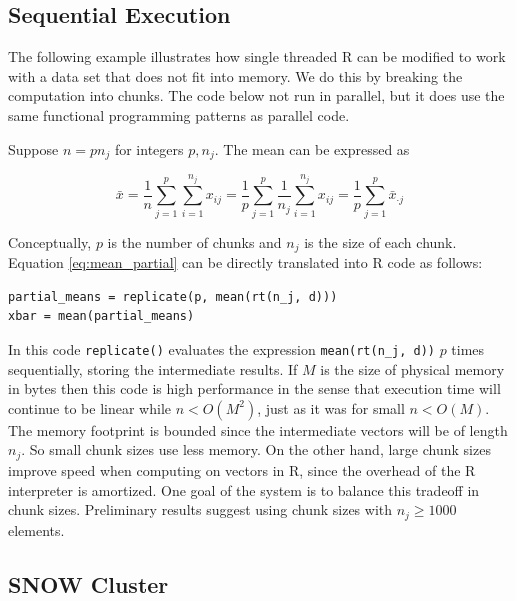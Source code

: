 \documentclass[12pt]{article}
\begin{document}
\subsection{Sequential Execution}
\label{sec:sequential}

The following example illustrates how single threaded R can be modified to
work with a data set that does not fit into memory. We do this 
by breaking the computation into chunks. The code below not run in parallel,
but it does use the same functional programming patterns as parallel code. 

Suppose $n = p n_j$ for integers $p, n_j$.  The mean can be
expressed as 

\begin{equation}
    \bar{x} = \frac{1}{n} \sum_{j = 1}^p \sum_{i = 1}^{n_j} x_{ij}
    = \frac{1}{p} \sum_{j = 1}^p \frac{1}{n_j} \sum_{i = 1}^{n_j} x_{ij}
    = \frac{1}{p} \sum_{j = 1}^p \bar{x}_{\cdot j}
\label{eq:mean_partial}
\end{equation}

Conceptually, $p$ is the number of chunks and $n_j$ is the size of each
chunk. Equation \ref{eq:mean_partial} can be directly translated into R
code as follows:

\begin{verbatim}
partial_means = replicate(p, mean(rt(n_j, d)))
xbar = mean(partial_means)
\end{verbatim}

In this code \texttt{replicate()} evaluates the expression
\texttt{mean(rt(n\_j, d))} $p$ times sequentially, storing the intermediate
results.  If $M$ is the size of physical memory in bytes then this code is
high performance in the sense that execution time will continue to be
linear while $n < O(M^2)$, just as it was for small $n < O(M)$. The memory
footprint is bounded since the intermediate vectors will be of length
$n_j$. So small chunk sizes use less memory. On the other hand, large chunk
sizes improve speed when computing on vectors in R, since the overhead of
the R interpreter is amortized. 
One goal of the system is to balance this tradeoff in chunk sizes. Preliminary results
suggest using chunk sizes with $n_j \geq 1000$ elements.



\subsection{SNOW Cluster}
\end{document}
